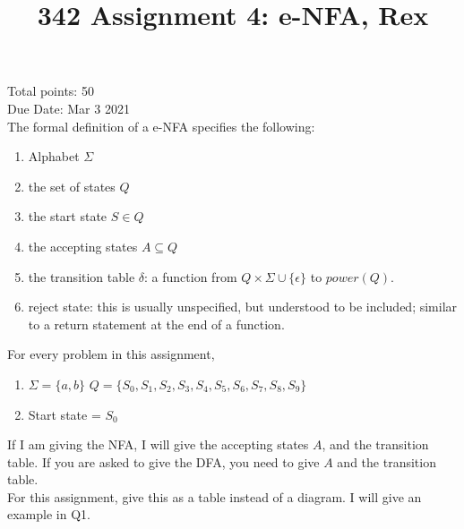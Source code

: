 \documentclass[10pt]{article}
\title{342 Assignment 4: e-NFA, Rex}
\begin{document}
\maketitle

Total points: 50\\
Due Date: Mar  $3$ 2021\\

The formal definition of a e-NFA specifies the following:\\
\begin{enumerate}
    \item Alphabet $\Sigma$
    \item the set of states $Q$
    \item the start state $S \in Q$
    \item the accepting states $A \subseteq  Q$
    \item the transition table $\delta$: a function from $Q \times \Sigma \cup \{\epsilon\}$ to $power(Q)$.
    \item reject state: this is usually unspecified, but understood to be included; similar to a return statement at the end of a function.
\end{enumerate}

For every problem in this assignment, 
\begin{enumerate}
    \item $\Sigma = \{a,b\}$
    \itme $Q = \{S_0,S_1,S_2,S_3,S_4,S_5,S_6,S_7,S_8,S_9\}$
    \item Start state = $S_0$ 
\end{enumerate}
If I am giving the NFA, I will give the accepting states $A$, and the transition table. If you are asked to give the DFA, you need to give $A$ and the transition table.\\ 
For this assignment, give this as a table instead of a diagram. I will give an example in Q1.
\end{document}
